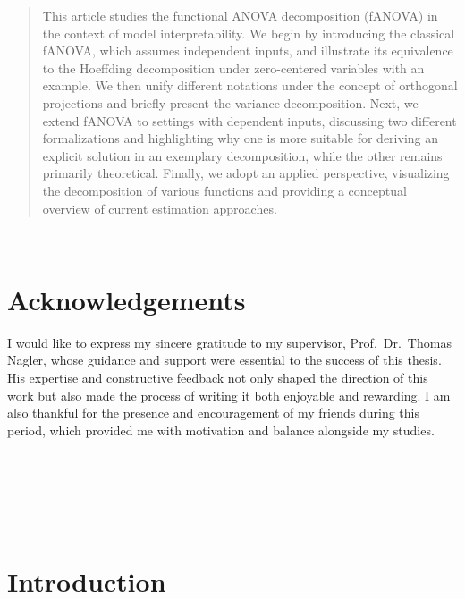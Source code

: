 \documentclass[12pt]{article}
\begin{document}
\begin{abstract}

This article studies the functional ANOVA decomposition (fANOVA) in the context of model interpretability.
We begin by introducing the classical fANOVA, which assumes independent inputs, and illustrate its equivalence to the Hoeffding decomposition under zero-centered variables with an example. We then unify different notations under the concept of orthogonal projections and briefly present the variance decomposition. Next, we extend fANOVA to settings with dependent inputs, discussing two different formalizations and highlighting why one is more suitable for deriving an explicit solution in an exemplary decomposition, while the other remains primarily theoretical. Finally, we adopt an applied perspective, visualizing the decomposition of various functions and providing a conceptual overview of current estimation approaches.
\end{abstract}


\newpage

\thispagestyle{empty}
~ 
\newpage

\section*{Acknowledgements}

I would like to express my sincere gratitude to my supervisor, Prof.\ Dr.\ Thomas Nagler, whose guidance and support were essential to the success of this thesis. 
His expertise and constructive feedback not only shaped the direction of this work but also made the process of writing it both enjoyable and rewarding.
I am also thankful for the presence and encouragement of my friends during this period, which provided me with motivation and balance alongside my studies.
\newpage

\thispagestyle{empty}
~ 
\newpage

\tableofcontents

\newpage
\thispagestyle{empty}
~ 
\newpage

\listoffigures
\newpage
\thispagestyle{empty}
~ 
\newpage



\section{Introduction}\label{sec:intro}

\newpage
\end{document}
